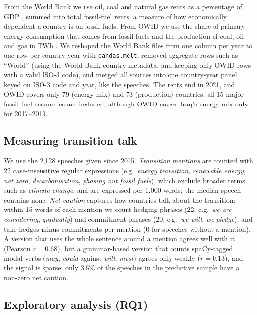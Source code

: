 \documentclass{llncs}
\begin{document}
From the World Bank we use oil, coal and natural gas rents as a percentage of GDP \cite{worldbank_wdi_oil,worldbank_wdi_coal,worldbank_wdi_gas}, summed into total fossil-fuel rents, a measure of how economically dependent a country is on fossil fuels. From OWID we use the share of primary energy consumption that comes from fossil fuels \cite{owid-energy-mix} and the production of coal, oil and gas in TWh \cite{owid-fossil-fuel-production}. We reshaped the World Bank files from one column per year to one row per country-year with \texttt{pandas.melt}, removed aggregate rows such as ``World'' (using the World Bank country metadata, and keeping only OWID rows with a valid ISO-3 code), and merged all sources into one country-year panel keyed on ISO-3 code and year, like the speeches. The rents end in 2021, and OWID covers only 79 (energy mix) and 73 (production) countries; all 15 major fossil-fuel economies are included, although OWID covers Iraq's energy mix only for 2017--2019.

\subsection{Measuring transition talk}\label{sec:talk}
We use the 2{,}128 speeches given since 2015. \emph{Transition mentions} are counted with 22 case-insensitive regular expressions (e.g.\ \textit{energy transition}, \textit{renewable energy}, \textit{net zero}, \textit{decarbonisation}, \textit{phasing out fossil fuels}), which exclude broader terms such as \textit{climate change}, and are expressed per 1{,}000 words; the median speech contains none. \emph{Net caution} captures how countries talk about the transition: within 15 words of each mention we count hedging phrases (22, e.g.\ \textit{we are considering}, \textit{gradually}) and commitment phrases (20, e.g.\ \textit{we will}, \textit{we pledge}), and take hedges minus commitments per mention (0 for speeches without a mention). A version that uses the whole sentence around a mention agrees well with it (Pearson $r = 0.68$), but a grammar-based version that counts spaCy-tagged modal verbs (\textit{may}, \textit{could} against \textit{will}, \textit{must}) agrees only weakly ($r = 0.13$), and the signal is sparse: only 3.6\% of the speeches in the predictive sample have a non-zero net caution.

\subsection{Exploratory analysis (RQ1)}\label{sec:eda}
\end{document}
